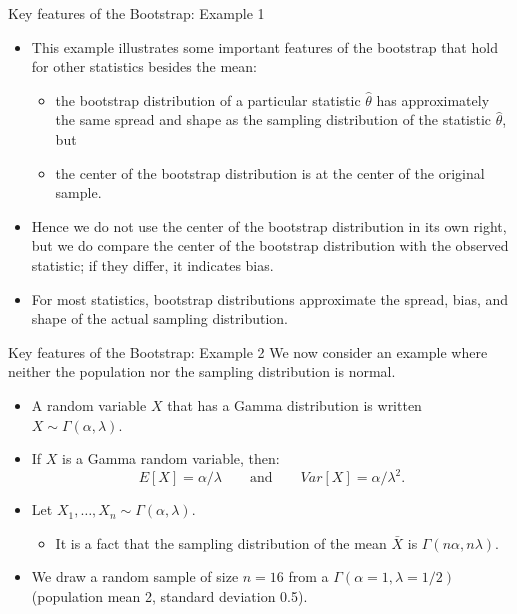 \documentclass[
  ignorenonframetext,
]{beamer}
\providecommand{\tightlist}{%
  \setlength{\itemsep}{0pt}\setlength{\parskip}{0pt}}
\begin{document}
\begin{frame}{Key features of the Bootstrap: Example 1}
\protect\hypertarget{key-features-of-the-bootstrap-example-1-4}{}
\begin{itemize}
\item
  This example illustrates some important features of the bootstrap that
  hold for other statistics besides the mean:

  \begin{itemize}
  \tightlist
  \item
    the bootstrap distribution of a particular statistic
    \(\hat{\theta}\) has approximately the same spread and shape as the
    sampling distribution of the statistic \(\hat{\theta}\), but
  \item
    the center of the bootstrap distribution is at the center of the
    original sample.
  \end{itemize}
\item
  Hence we do not use the center of the bootstrap distribution in its
  own right, but we do compare the center of the bootstrap distribution
  with the observed statistic; if they differ, it indicates bias.
\item
  For most statistics, bootstrap distributions approximate the spread,
  bias, and shape of the actual sampling distribution.
\end{itemize}
\end{frame}

\begin{frame}{Key features of the Bootstrap: Example 2}
\protect\hypertarget{key-features-of-the-bootstrap-example-2}{}
We now consider an example where neither the population nor the sampling
distribution is normal.

\begin{itemize}
\item
  A random variable \(X\) that has a Gamma distribution is written
  \(X\sim \Gamma(\alpha, \lambda)\).
\item
  If \(X\) is a Gamma random variable, then:
  \[E[X]=\alpha/\lambda \quad \quad \text{and} \quad \quad Var[X]=\alpha/\lambda^2.\]
\item
  Let \(X_1, \ldots, X_n\sim \Gamma(\alpha, \lambda)\).

  \begin{itemize}
  \tightlist
  \item
    It is a fact that the sampling distribution of the mean \(\bar{X}\)
    is \(\Gamma(n\alpha, n\lambda)\).
  \end{itemize}
\item
  We draw a random sample of size \(n=16\) from a
  \(\Gamma(\alpha=1, \lambda=1/2)\) (population mean 2, standard
  deviation 0.5).
\end{itemize}
\end{frame}
\end{document}
